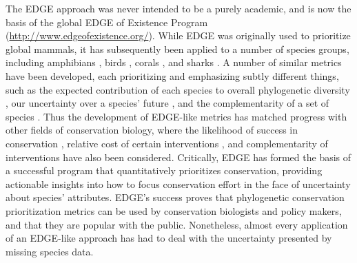 \documentclass[12pt,english]{article}
\begin{document}
The EDGE approach was never intended to be a purely academic, and is now
the basis of the global EDGE of Existence Program
(\url{http://www.edgeofexistence.org/}). While EDGE was originally used to
prioritize global mammals, it has subsequently been applied to a number of
species groups, including amphibians \autocite{Isaac2012}, birds 
\autocite{Jetz2014}, corals \autocite{Curnick2015}, and sharks
\autocite{Stein2018}. A number of similar metrics  have been developed, each
prioritizing and emphasizing subtly different things, such as the expected
contribution of each species to overall phylogenetic diversity
\autocite[HEDGE;][]{Steel2007}, our uncertainty over a species' future
\autocite[EDAM;][]{Pearse2015}, and the complementarity of a set of species
\autocite{Faith2008,Jensen2016}. Thus the development of EDGE-like metrics has
matched progress with other fields of conservation biology, where the likelihood
of success in conservation \autocite{Wilson2007, Mcbride2007}, relative cost of
certain interventions \autocite{Naidoo2006}, and complementarity of
interventions \autocite{Pressey1993, Myers2000} have also been considered.
Critically, EDGE has formed the basis of a successful program that
quantitatively prioritizes conservation, providing actionable insights into how
to focus conservation effort in the face of uncertainty about species'
attributes. EDGE's success proves that phylogenetic conservation prioritization
metrics can be used by conservation biologists and policy makers, and that they
are popular with the public. Nonetheless, almost every application of an
EDGE-like approach has had to deal with the uncertainty presented by missing
species data.
\end{document}
